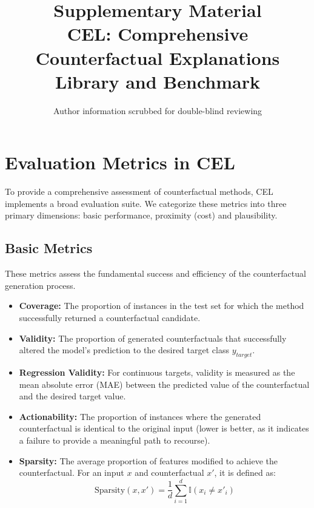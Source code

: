 \documentclass[runningheads]{llncs}
\begin{document}
\title{Supplementary Material\\CEL: Comprehensive Counterfactual Explanations Library and Benchmark}

\author{Author information scrubbed for double-blind reviewing}
\institute{}

\maketitle

\appendix

\section{Evaluation Metrics in CEL}
\label{app:metrics}
To provide a comprehensive assessment of counterfactual methods, CEL implements a broad evaluation suite. We categorize these metrics into three primary dimensions: basic performance, proximity (cost) and plausibility.
\subsection{Basic Metrics}
These metrics assess the fundamental success and efficiency of the counterfactual generation process.
\begin{itemize}
    \item \textbf{Coverage:} The proportion of instances in the test set for which the method successfully returned a counterfactual candidate.
    \item \textbf{Validity:} The proportion of generated counterfactuals that successfully altered the model's prediction to the desired target class $y_{target}$.
    \item \textbf{Regression Validity:} For continuous targets, validity is measured as the mean absolute error (MAE) between the predicted value of the counterfactual and the desired target value.
    \item \textbf{Actionability:} The proportion of instances where the generated counterfactual is identical to the original input (lower is better, as it indicates a failure to provide a meaningful path to recourse).
    \item \textbf{Sparsity:} The average proportion of features modified to achieve the counterfactual. For an input $x$ and counterfactual $x'$, it is defined as:
    \begin{equation}
        \text{Sparsity}(x, x') = \frac{1}{d} \sum_{i=1}^{d} \mathbb{I}(x_i \neq x'_i)
    \end{equation}
\end{itemize}
\end{document}
